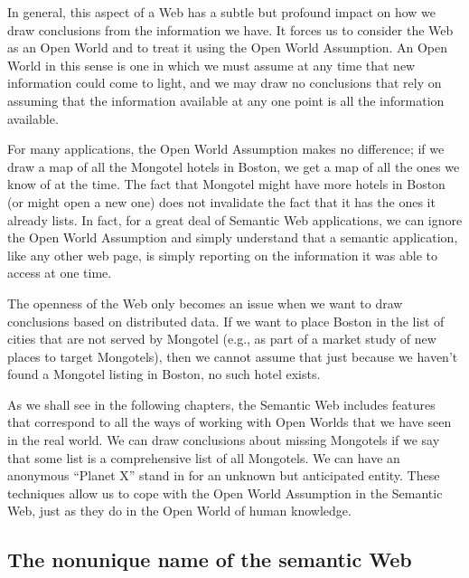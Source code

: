 In general, this aspect of a Web has a subtle but profound impact on how
we draw conclusions from the information we have. It forces us to
consider the Web as an Open World and to treat it using the Open World
Assumption. An Open World in this sense is one in which we must assume
at any time that new information could come to light, and we may draw no
conclusions that rely on assuming that the information available at any
one point is all the information available.

For many applications, the Open World Assumption makes no difference; if
we draw a map of all the Mongotel hotels in Boston, we get a map of all
the ones we know of at the time. The fact that Mongotel might have more
hotels in Boston (or might open a new one) does not invalidate the fact
that it has the ones it already lists. In fact, for a great deal of
Semantic Web applications, we can ignore the Open World Assumption and
simply understand that a semantic application, like any other web page,
is simply reporting on the information it was able to access at one
time.

The openness of the Web only becomes an issue when we want to draw
conclusions based on distributed data. If we want to place Boston in the
list of cities that are not served by Mongotel (e.g., as part of a
market study of new places to target Mongotels), then we cannot assume
that just because we haven't found a Mongotel listing in Boston, no such
hotel exists.

As we shall see in the following chapters, the Semantic Web includes
features that correspond to all the ways of working with Open Worlds
that we have seen in the real world. We can draw conclusions about
missing Mongotels if we say that some list is a comprehensive list of
all Mongotels. We can have an anonymous ``Planet X'' stand in for an
unknown but anticipated entity. These techniques allow us to cope with
the Open World Assumption in the Semantic Web, just as they do in the
Open World of human knowledge.

\subsection{The nonunique name of the semantic Web}

